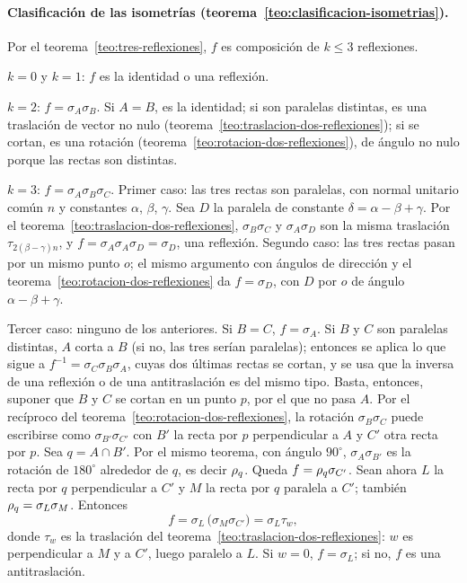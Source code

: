 \paragraph{Clasificación de las isometrías (teorema~\ref{teo:clasificacion-isometrias}).}
\begin{demostracion}
Por el teorema~\ref{teo:tres-reflexiones}, \(f\) es composición de \(k\le3\) reflexiones.

\(k=0\) y \(k=1\): \(f\) es la identidad o una reflexión.

\(k=2\): \(f=\sigma_{A}\sigma_{B}\). Si \(A=B\), es la identidad; si son paralelas distintas, es
una traslación de vector no nulo (teorema~\ref{teo:traslacion-dos-reflexiones}); si se cortan,
es una rotación (teorema~\ref{teo:rotacion-dos-reflexiones}), de ángulo no nulo porque las
rectas son distintas.

\(k=3\): \(f=\sigma_{A}\sigma_{B}\sigma_{C}\). Primer caso: las tres rectas son paralelas, con
normal unitario común \(n\) y constantes \(\alpha\), \(\beta\), \(\gamma\). Sea \(D\) la
paralela de constante \(\delta=\alpha-\beta+\gamma\). Por el
teorema~\ref{teo:traslacion-dos-reflexiones}, \(\sigma_{B}\sigma_{C}\) y \(\sigma_{A}\sigma_{D}\) son
la misma traslación \(\tau_{2(\beta-\gamma)n}\), y
\(f=\sigma_{A}\sigma_{A}\sigma_{D}=\sigma_{D}\), una reflexión. Segundo caso: las tres rectas pasan por
un mismo punto \(o\); el mismo argumento con ángulos de dirección y el
teorema~\ref{teo:rotacion-dos-reflexiones} da \(f=\sigma_{D}\), con \(D\) por \(o\) de ángulo
\(\alpha-\beta+\gamma\).

Tercer caso: ninguno de los anteriores. Si \(B=C\), \(f=\sigma_{A}\). Si \(B\) y \(C\) son paralelas distintas, \(A\) corta a \(B\)
(si no, las tres serían paralelas); entonces se aplica lo que sigue a
\(f^{-1}=\sigma_{C}\sigma_{B}\sigma_{A}\), cuyas dos últimas rectas se cortan, y se usa que la
inversa de una reflexión o de una antitraslación es del mismo tipo. Basta, entonces,
suponer que \(B\) y \(C\) se cortan en un punto \(p\), por el que no pasa \(A\). Por el recíproco
del teorema~\ref{teo:rotacion-dos-reflexiones}, la rotación \(\sigma_{B}\sigma_{C}\) puede
escribirse como \(\sigma_{B'}\sigma_{C'}\) con \(B'\) la recta por \(p\) perpendicular a \(A\) y
\(C'\) otra recta por \(p\). Sea \(q=A\cap B'\). Por el mismo teorema, con ángulo \(90^\circ\),
\(\sigma_{A}\sigma_{B'}\) es la rotación de \(180^\circ\) alrededor de \(q\), es decir
\(\rho_{q}\). Queda \(f=\rho_{q}\sigma_{C'}\). Sean ahora \(L\) la recta por \(q\) perpendicular
a \(C'\) y \(M\) la recta por \(q\) paralela a \(C'\); también \(\rho_{q}=\sigma_{L}\sigma_{M}\).
Entonces
\[
  f=\sigma_{L}\,\bigl(\sigma_{M}\sigma_{C'}\bigr)=\sigma_{L}\tau_w ,
\]
donde \(\tau_w\) es la traslación del teorema~\ref{teo:traslacion-dos-reflexiones}: \(w\) es
perpendicular a \(M\) y a \(C'\), luego paralelo a \(L\). Si \(w=0\), \(f=\sigma_{L}\); si no,
\(f\) es una antitraslación.


\end{demostracion}
